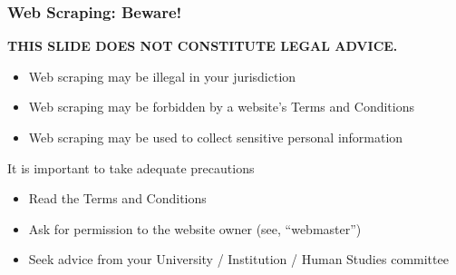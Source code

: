 \documentclass[10pt, aspectratio=1610, natbib, handout]{beamer}
\begin{document}





  \begin{frame}
    \frametitle{Web Scraping: Beware!}

    \begin{center}
      \textbf{THIS SLIDE DOES NOT CONSTITUTE LEGAL ADVICE.}
    \end{center}

    \vfill\pause

    \begin{itemize}
      \item Web scraping may be illegal in your jurisdiction
      \item Web scraping may be forbidden by a website's Terms and Conditions
      \item Web scraping may be used to collect sensitive personal information
    \end{itemize}

    \vfill\pause

    It is important to take adequate precautions
    \begin{itemize}
      \item Read the Terms and Conditions
      \item Ask for permission to the website owner (see, ``webmaster'')
      \item Seek advice from your University / Institution / Human Studies committee
    \end{itemize}

  \end{frame}
\end{document}
